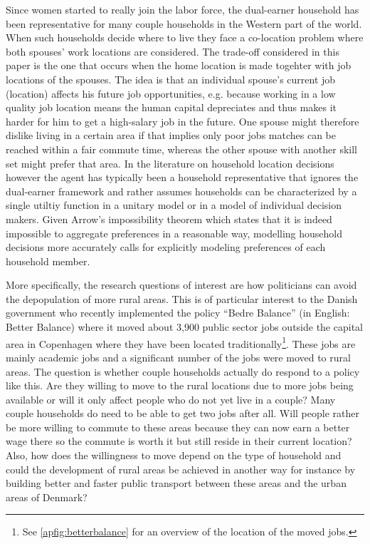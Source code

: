 Since women started to really join the labor force, the dual-earner household has been representative for many couple households in the Western part of the world. When such households decide where to live they face a co-location problem where both spouses' work locations are considered. The trade-off considered in this paper is the one that occurs when the home location is made togehter with job locations of the spouses. The idea is that an individual spouse's current job (location) affects his future job opportunities, e.g. because working in a low quality job location means the human capital depreciates and thus makes it harder for him to get a high-salary job in the future. One spouse might therefore dislike living in a certain area if that implies only poor jobs matches can be reached within a fair commute time, whereas the other spouse with another skill set might prefer that area. In the literature on household location decisions however the agent has typically been a household representative that ignores the dual-earner framework and rather assumes households can be characterized by a single utiltiy function in a unitary model or in a model of individual decision makers. Given Arrow's impossibility theorem which states that it is indeed impossible to aggregate preferences in a reasonable way, modelling household decisions more accurately calls for explicitly modeling preferences of each household member. 

More specifically, the research questions of interest are how politicians can avoid the depopulation of more rural areas. This is of particular interest to the Danish government who recently implemented the policy ``Bedre Balance'' (in English: Better Balance) where it moved about 3,900 public sector jobs outside the capital area in Copenhagen where they have been located traditionally\footnote{See \autoref{apfig:betterbalance} for an overview of the location of the moved jobs.}. These jobs are mainly academic jobs and a significant number of the jobs were moved to rural areas. The question is whether couple households actually do respond to a policy like this. Are they willing to move to the rural locations due to more jobs being available or will it only affect people who do not yet live in a couple? Many couple households do need to be able to get two jobs after all. Will people rather be more willing to commute to these areas because they can now earn a better wage there so the commute is worth it but still reside in their current location? Also, how does the willingness to move depend on the type of household and could the development of rural areas be achieved in another way for instance by building better and faster public transport between these areas and the urban areas of Denmark?

